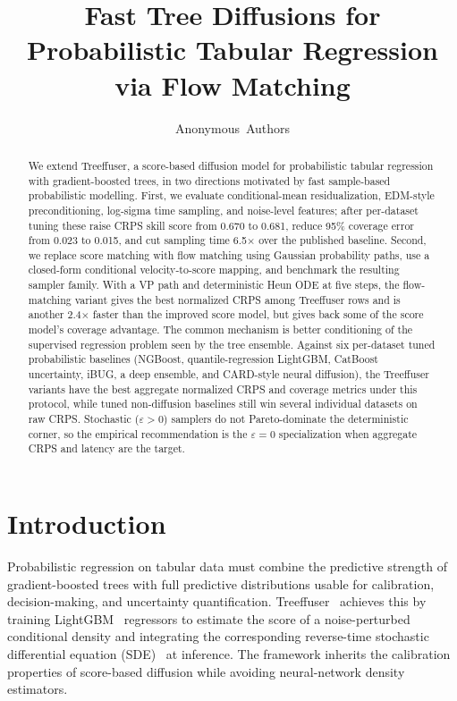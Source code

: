 \documentclass{uai2026}
\title{Fast Tree Diffusions for Probabilistic Tabular Regression via Flow Matching}
\author[1]{Anonymous~Authors}
\affil[1]{Anonymous Institution}
\begin{document}
\maketitle

\begin{abstract}
We extend Treeffuser, a score-based diffusion model for probabilistic tabular regression with gradient-boosted trees, in two directions motivated by fast sample-based probabilistic modelling. First, we evaluate conditional-mean residualization, EDM-style preconditioning, log-sigma time sampling, and noise-level features; after per-dataset tuning these raise CRPS skill score from 0.670 to 0.681, reduce 95\% coverage error from 0.023 to 0.015, and cut sampling time 6.5$\times$ over the published baseline. Second, we replace score matching with flow matching using Gaussian probability paths, use a closed-form conditional velocity-to-score mapping, and benchmark the resulting sampler family. With a VP path and deterministic Heun ODE at five steps, the flow-matching variant gives the best normalized CRPS among Treeffuser rows and is another 2.4$\times$ faster than the improved score model, but gives back some of the score model's coverage advantage. The common mechanism is better conditioning of the supervised regression problem seen by the tree ensemble. Against six per-dataset tuned probabilistic baselines (NGBoost, quantile-regression LightGBM, CatBoost uncertainty, iBUG, a deep ensemble, and CARD-style neural diffusion), the Treeffuser variants have the best aggregate normalized CRPS and coverage metrics under this protocol, while tuned non-diffusion baselines still win several individual datasets on raw CRPS. Stochastic ($\varepsilon > 0$) samplers do not Pareto-dominate the deterministic corner, so the empirical recommendation is the $\varepsilon = 0$ specialization when aggregate CRPS and latency are the target.
\end{abstract}

\section{Introduction}\label{sec:intro}
Probabilistic regression on tabular data must combine the predictive strength of gradient-boosted trees with full predictive distributions usable for calibration, decision-making, and uncertainty quantification. Treeffuser~\citep{treeffuser} achieves this by training LightGBM~\citep{ke2017lightgbm} regressors to estimate the score of a noise-perturbed conditional density and integrating the corresponding reverse-time stochastic differential equation (SDE)~\citep{song2021score} at inference. The framework inherits the calibration properties of score-based diffusion while avoiding neural-network density estimators.
\end{document}
